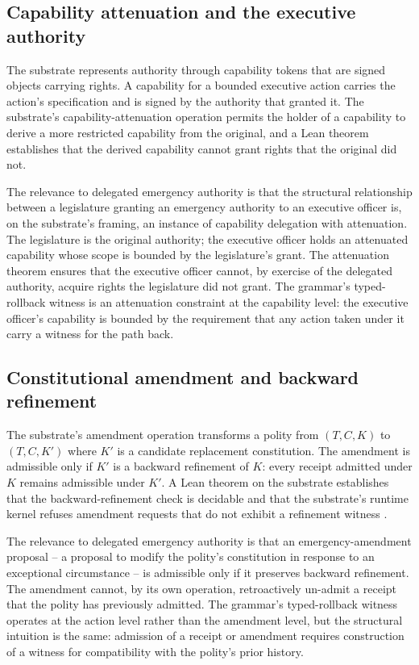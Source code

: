 \subsection{Capability attenuation and the executive authority}

The substrate represents authority through capability tokens that are signed objects carrying rights.
A capability for a bounded executive action carries the action's specification and is signed by the authority
that granted it.
The substrate's capability-attenuation operation permits the holder of a capability to derive a more restricted
capability from the original,
and a Lean theorem \cite{ref_chio_parent_paper} establishes that the derived capability cannot grant rights
that the original did not.

The relevance to delegated emergency authority is that the structural relationship between a legislature granting
an emergency authority to an executive officer is, on the substrate's framing, an instance of capability delegation
with attenuation.
The legislature is the original authority;
the executive officer holds an attenuated capability whose scope is bounded by the legislature's grant.
The attenuation theorem ensures that the executive officer cannot, by exercise of the delegated authority,
acquire rights the legislature did not grant.
The grammar's typed-rollback witness is an attenuation constraint at the capability level:
the executive officer's capability is bounded by the requirement that any action taken under it
carry a witness for the path back.

\subsection{Constitutional amendment and backward refinement}

The substrate's amendment operation transforms a polity from $(T, C, K)$ to $(T, C, K')$ where $K'$ is a
candidate replacement constitution.
The amendment is admissible only if $K'$ is a backward refinement of $K$:
every receipt admitted under $K$ remains admissible under $K'$.
A Lean theorem on the substrate establishes that the backward-refinement check is decidable and that the
substrate's runtime kernel refuses amendment requests that do not exhibit a refinement witness
\cite{ref_chio_parent_paper}.

The relevance to delegated emergency authority is that an emergency-amendment proposal --
a proposal to modify the polity's constitution in response to an exceptional circumstance --
is admissible only if it preserves backward refinement.
The amendment cannot, by its own operation, retroactively un-admit a receipt that the polity has previously admitted.
The grammar's typed-rollback witness operates at the action level rather than the amendment level,
but the structural intuition is the same:
admission of a receipt or amendment requires construction of a witness for compatibility with the polity's
prior history.

